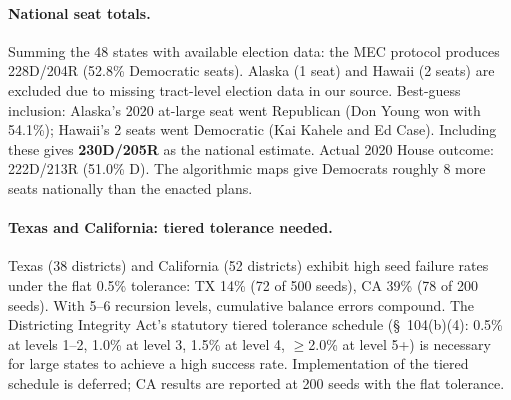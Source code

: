\paragraph{National seat totals.}
Summing the 48 states with available election data: the MEC protocol produces
228D/204R (52.8\% Democratic seats). Alaska (1 seat) and Hawaii (2 seats) are
excluded due to missing tract-level election data in our source. Best-guess
inclusion: Alaska's 2020 at-large seat went Republican (Don Young won with
54.1\%); Hawaii's 2 seats went Democratic (Kai Kahele and Ed Case). Including
these gives \textbf{230D/205R} as the national estimate.
Actual 2020 House outcome: 222D/213R (51.0\% D). The
algorithmic maps give Democrats roughly 8 more seats nationally than the
enacted plans.

\paragraph{Texas and California: tiered tolerance needed.}
Texas (38 districts) and California (52 districts) exhibit high seed failure
rates under the flat 0.5\% tolerance: TX 14\% (72 of 500 seeds), CA 39\%
(78 of 200 seeds). With 5--6 recursion levels, cumulative balance errors
compound. The Districting Integrity Act's statutory tiered tolerance schedule
(\S~104(b)(4): 0.5\% at levels 1--2, 1.0\% at level 3, 1.5\% at level 4,
$\geq$2.0\% at level 5+) is necessary for large states to achieve a high
success rate. Implementation of the tiered schedule is deferred; CA results
are reported at 200 seeds with the flat tolerance.

